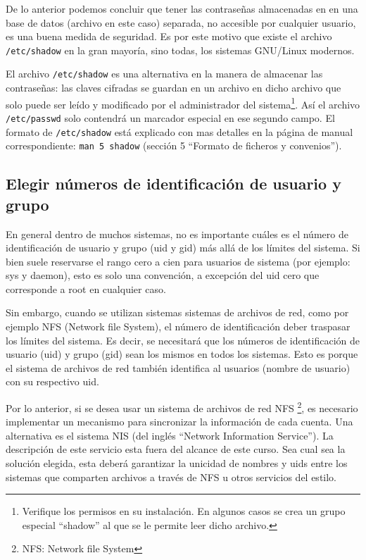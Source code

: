 \documentclass[12pt]{article}
\begin{document}
De lo anterior podemos concluir que tener las contraseñas almacenadas en 
en una base de datos (archivo en este caso) separada, 
no accesible por cualquier usuario, es una buena medida de seguridad. Es por este motivo 
que existe el archivo \texttt{/etc/shadow} en la gran mayoría, sino todas, los sistemas
GNU/Linux modernos.  

El archivo \texttt{/etc/shadow} es una alternativa en la manera de
almacenar las contraseñas: las claves cifradas se guardan en un archivo
en dicho archivo que solo puede ser leído y modificado por el administrador del 
sistema\footnote{Verifique los permisos en su instalación. En algunos casos se crea 
un grupo especial ``shadow'' al que se le permite leer dicho archivo.}. Así el 
archivo \texttt{/etc/passwd} solo contendrá un marcador especial en ese segundo campo. 
El formato de \texttt{/etc/shadow} está explicado con mas detalles en la página de 
manual correspondiente: \texttt{man 5 shadow} (sección 5 ``Formato de ficheros y convenios'').


\subsection{Elegir números de identificación de usuario y grupo}
En general dentro de muchos sistemas, no es importante cuáles es el número de 
identificación de usuario y grupo (uid y gid) más allá de los límites del sistema. 
Si bien suele reservarse el rango cero a cien 
para usuarios de sistema (por ejemplo: sys y daemon), esto es solo una convención, 
a excepción del uid cero que corresponde a root en cualquier caso.  

Sin embargo, cuando se utilizan sistemas sistemas de archivos de red, como 
por ejemplo NFS (Network file System), el número de identificación deber traspasar
los límites del sistema. Es decir, se necesitará que
los números de identificación de usuario (uid) y grupo (gid) sean los mismos en todos
los sistemas. Esto es porque el sistema de archivos de red también identifica al
usuarios (nombre de usuario) con su respectivo uid.  

Por lo anterior, si se desea usar un sistema de archivos de red NFS
\footnote{NFS: Network file System}, es necesario implementar un mecanismo 
para sincronizar la información de cada cuenta. Una alternativa es el sistema NIS
(del inglés ``Network Information Service''). La descripción de este servicio 
esta fuera del alcance de este curso. Sea cual sea la solución elegida, esta deberá 
garantizar la unicidad de nombres y uids entre los sistemas que comparten 
archivos a través de NFS u otros servicios del estilo. 
\end{document}
